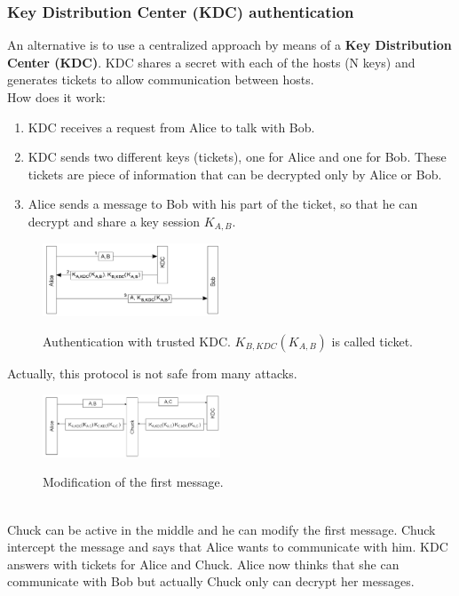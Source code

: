 \documentclass[10pt,a4paper]{article}
\begin{document}
\subsubsection{Key Distribution Center (KDC) authentication}
An alternative is to use a centralized approach by means of a \textbf{Key Distribution Center (KDC)}. KDC shares a secret with each of the hosts (N keys) and generates tickets to allow communication between hosts. \\
How does it work:
\begin{enumerate}
	\item KDC receives a request from Alice to talk with Bob.
	\item KDC sends two different keys (tickets), one for Alice and one for Bob. These tickets are piece of information that can be decrypted only by Alice or Bob.
	\item Alice sends a message to Bob with his part of the ticket, so that he can decrypt and share a key session $K_{A,B}$.
\end{enumerate}
\begin{figure}[h!]\hfill \includegraphics[width=150pt]{images/kdc.png}\hspace*{\fill}
  \label{fig:kdc}
  \caption{Authentication with trusted KDC. $K_{B,KDC}(K_{A,B})$ is called ticket.}
\end{figure}
Actually, this protocol is not safe from many attacks.
\begin{figure}[h!]\hfill \includegraphics[width=150pt]{images/kdc2.png}\hspace*{\fill}
  \label{fig:kdc2}
  \caption{Modification of the first message.}
\end{figure} \\
Chuck can be active in the middle and he can modify the first message. Chuck intercept the message and says that Alice wants to communicate with him. KDC answers with tickets for Alice and Chuck. Alice now thinks that she can communicate with Bob but actually Chuck only can decrypt her messages. \\
\end{document}
